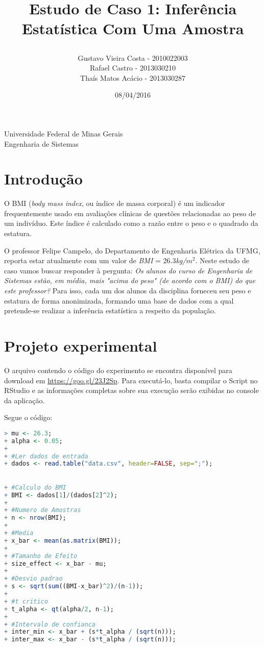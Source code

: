 \documentclass[12pt, a4paper]{article}
\title{
	\begin{large}
		Estudo de Caso 1: Inferência Estatística Com Uma Amostra
	\end{large}	}
\author{Gustavo Vieira Costa - 2010022003\\Rafael Castro - 2013030210\\Thaís Matos Acácio - 2013030287}
\date{08/04/2016}
\begin{document}
	\maketitle
	
	\vspace*{-7.5cm}
	{\bf
		\begin{center}
			{\large
				\hspace*{0cm}Universidade Federal de Minas Gerais} \\
			\hspace*{0cm}Engenharia de Sistemas  \\
		\end{center}
	}
	\vspace*{5cm}
	
\section{Introdução}
O BMI (\textit{body mass index}, ou índice de massa corporal) é um indicador frequentemente usado em avaliações clínicas de questões relacionadas ao peso de um indivíduo. Este índice é calculado como a razão entre o peso e o quadrado da estatura.
\par O professor Felipe Campelo, do Departamento de Engenharia Elétrica da UFMG, reporta estar atualmente com um valor de \textit{BMI} = 26.3\textit{kg/$m^{2}$}. Neste estudo de caso vamos buscar responder à pergunta: \textit{Os alunos do curso de Engenharia de Sistemas estão, em média, mais "acima do peso" (de acordo com o BMI) do que este professor?} Para isso, cada um dos alunos da disciplina forneceu seu peso e estatura de forma anonimizada, formando uma base de dados com a qual pretende-se realizar a inferência estatística a respeito da população.
	
\section{Projeto experimental}
\label{sec:projeto-experimental}
O arquivo contendo o código do experimento se encontra disponível para download em \url{https://goo.gl/23J2Sp}. Para executá-lo, basta compilar o Script no RStudio e as informações completas sobre sua execução serão exibidas no console da aplicação.

Segue o código:

\begin{lstlisting}[language=R]
> mu <- 26.3;
+ alpha <- 0.05;
+	
+ #Ler dados de entrada
+ dados <- read.table("data.csv", header=FALSE, sep=";");
	

+ #Calculo do BMI
+ BMI <- dados[1]/(dados[2]^2);
+	
+ #Numero de Amostras
+ n <- nrow(BMI);
+	
+ #Media
+ x_bar <- mean(as.matrix(BMI));
+	
+ #Tamanho de Efeito
+ size_effect <- x_bar - mu;
+	
+ #Desvio padrao
+ s <- sqrt(sum((BMI-x_bar)^2)/(n-1));
+	
+ #t critico
+ t_alpha <- qt(alpha/2, n-1);
+	
+ #Intervalo de confianca
+ inter_min <- x_bar + (s*t_alpha / (sqrt(n)));
+ inter_max <- x_bar - (s*t_alpha / (sqrt(n)));	
\end{lstlisting}
	
\end{document}
